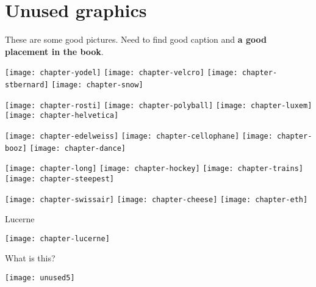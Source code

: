 \section{Unused graphics}

These are some good pictures. Need to find good caption and \textbf{a good placement in the book}.

\texttt{[image: chapter-yodel]}
\texttt{[image: chapter-velcro]}
\texttt{[image: chapter-stbernard]}
\texttt{[image: chapter-snow]}

\texttt{[image: chapter-rosti]}
\texttt{[image: chapter-polyball]}
\texttt{[image: chapter-luxem]}
\texttt{[image: chapter-helvetica]}

\texttt{[image: chapter-edelweiss]}
\texttt{[image: chapter-cellophane]}
\texttt{[image: chapter-booz]}
\texttt{[image: chapter-dance]}

\texttt{[image: chapter-long]}
\texttt{[image: chapter-hockey]}
\texttt{[image: chapter-trains]}
\texttt{[image: chapter-steepest]}

\texttt{[image: chapter-swissair]}
\texttt{[image: chapter-cheese]}
\texttt{[image: chapter-eth]}

Lucerne

\texttt{[image: chapter-lucerne]}

What is this?

\texttt{[image: unused5]}


